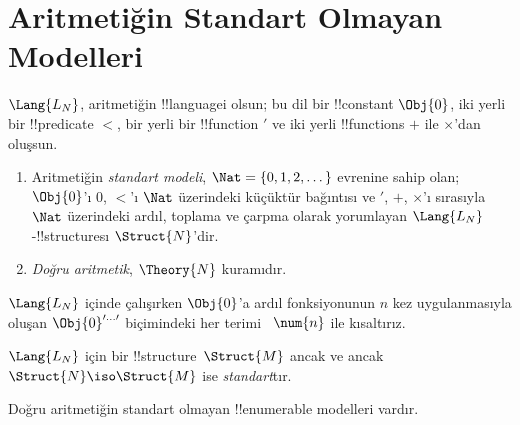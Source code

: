 

\section{Aritmetiğin Standart Olmayan Modelleri}
\allmodulesmark

\begin{defn}
$\Lang{L_N}$, aritmetiğin !!{language}{}i olsun; bu dil bir !!{constant}
$\Obj{0}$, iki yerli bir !!{predicate} $<$, bir yerli bir !!{function}
$\prime$ ve iki yerli !!{function}s $+$ ile $\times$'dan oluşsun.
\begin{enumerate}
\item Aritmetiğin \emph{standart modeli}, $\Nat = \{ 0, 1, 2, \dots\}$
  evrenine sahip olan; $\Obj{0}$'ı $0$, $<$'ı $\Nat$ üzerindeki küçüktür
  bağıntısı ve $\prime$, $+$, $\times$'ı sırasıyla $\Nat$ üzerindeki ardıl,
  toplama ve çarpma olarak yorumlayan $\Lang{L_N}$-!!{structure}{}sı
  $\Struct{N}$'dir.
\item \emph{Doğru aritmetik}, $\Theory{N}$ kuramıdır.
\end{enumerate}
\end{defn}

$\Lang{L_N}$ içinde çalışırken $\Obj{0}$'a ardıl fonksiyonunun $n$ kez
uygulanmasıyla oluşan $\Obj{0}^{\prime\dots\prime}$ biçimindeki her terimi
~$\num{n}$ ile kısaltırız.

\begin{defn}
$\Lang{L_N}$ için bir !!{structure}~$\Struct{M}$ ancak ve ancak
$\Struct{N} \iso \Struct{M}$ ise \emph{standart}tır.
\end{defn}

\begin{thm}
Doğru aritmetiğin standart olmayan !!{enumerable} modelleri vardır.
\end{thm}

